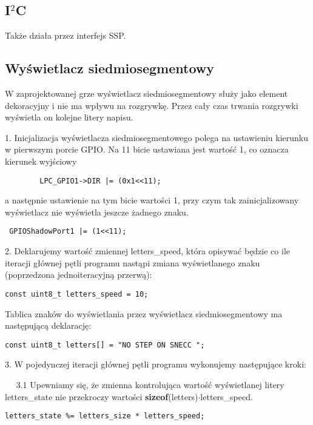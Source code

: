 \documentclass[a4paper,12pt,twoside]{article}
\theoremstyle{plain}
\theoremstyle{definition}
\theoremstyle{remark}
\begin{document}
\subsection{I$^2$C}
Także działa przez interfejs SSP.

\subsection{Wyświetlacz siedmiosegmentowy}
W zaprojektowanej grze wyświetlacz siedmiosegmentowy służy jako element dekoracyjny i nie ma wpływu na rozgrywkę. Przez cały czas trwania rozgrywki wyświetla on kolejne litery napisu.

1. Inicjalizacja wyświetlacza siedmiosegmentowego polega na ustawieniu kierunku w pierwszym porcie GPIO. Na 11 bicie ustawiana jest wartość 1, co oznacza kierunek wyjściowy
\begin{verbatim}
		LPC_GPIO1->DIR |= (0x1<<11);
\end{verbatim}
a następnie ustawienie na tym bicie wartości 1, przy czym tak zainicjalizowany wyświetlacz nie wyświetla jeszcze żadnego znaku.
\begin{verbatim}
 GPIOShadowPort1 |= (1<<11);
\end{verbatim}

2. Deklarujemy wartość zmiennej letters\_speed, która opisywać będzie co ile iteracji głównej pętli programu nastąpi zmiana wyświetlanego znaku (poprzedzona jednoiteracyjną przerwą):
\begin{verbatim}
const uint8_t letters_speed = 10;
\end{verbatim}
Tablica znaków do wyświetlania przez wyświetlacz siedmiosegmentowy ma następującą deklarację:
\begin{verbatim}
const uint8_t letters[] = "NO STEP ON SNECC ";
\end{verbatim}

3. W pojedynczej iteracji głównej pętli programu wykonujemy następujące kroki:

$\quad$ 3.1 Upewniamy się, że zmienna kontrolująca wartość wyświetlanej litery letters\_state nie przekroczy wartości \textbf{sizeof}(letters)$\cdot$letters\_speed.
\begin{verbatim}
letters_state %= letters_size * letters_speed;
\end{verbatim}
\end{document}
